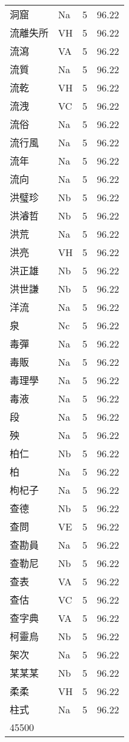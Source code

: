 \documentclass[twocolumn]{book}
\begin{document}
\begin{supertabular}{llrr}
洞窟 & Na & 5 &  96.22\\
流離失所 & VH & 5 &  96.22\\
流瀉 & VA & 5 &  96.22\\
流質 & Na & 5 &  96.22\\
流乾 & VH & 5 &  96.22\\
流洩 & VC & 5 &  96.22\\
流俗 & Na & 5 &  96.22\\
流行風 & Na & 5 &  96.22\\
流年 & Na & 5 &  96.22\\
流向 & Na & 5 &  96.22\\
洪璧珍 & Nb & 5 &  96.22\\
洪濬哲 & Nb & 5 &  96.22\\
洪荒 & Na & 5 &  96.22\\
洪亮 & VH & 5 &  96.22\\
洪正雄 & Nb & 5 &  96.22\\
洪世謙 & Nb & 5 &  96.22\\
洋流 & Na & 5 &  96.22\\
泉 & Nc & 5 &  96.22\\
毒彈 & Na & 5 &  96.22\\
毒販 & Na & 5 &  96.22\\
毒理學 & Na & 5 &  96.22\\
毒液 & Na & 5 &  96.22\\
段 & Na & 5 &  96.22\\
殃 & Na & 5 &  96.22\\
柏仁 & Nb & 5 &  96.22\\
柏 & Na & 5 &  96.22\\
枸杞子 & Na & 5 &  96.22\\
查德 & Nb & 5 &  96.22\\
查問 & VE & 5 &  96.22\\
查勘員 & Na & 5 &  96.22\\
查勒尼 & Nb & 5 &  96.22\\
查表 & VA & 5 &  96.22\\
查估 & VC & 5 &  96.22\\
查字典 & VA & 5 &  96.22\\
柯靈烏 & Nb & 5 &  96.22\\
架次 & Na & 5 &  96.22\\
某某某 & Nb & 5 &  96.22\\
柔柔 & VH & 5 &  96.22\\
柱式 & Na & 5 &  96.22\\
45500\\

\end{supertabular}
\end{document}
